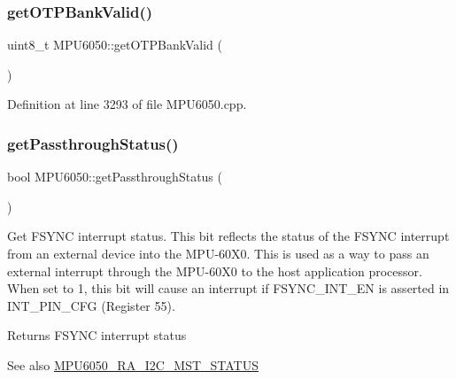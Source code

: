 \subsubsection{\texorpdfstring{getOTPBankValid()}{getOTPBankValid()}}
{\footnotesize\ttfamily uint8\+\_\+t M\+P\+U6050\+::get\+O\+T\+P\+Bank\+Valid (\begin{DoxyParamCaption}{ }\end{DoxyParamCaption})}



Definition at line 3293 of file M\+P\+U6050.\+cpp.


\begin{DoxyCode}{0}

\end{DoxyCode}
\mbox{\label{classMPU6050_af2820067b73f177d985ed81e894281b0}} 
\subsubsection{\texorpdfstring{getPassthroughStatus()}{getPassthroughStatus()}}
{\footnotesize\ttfamily bool M\+P\+U6050\+::get\+Passthrough\+Status (\begin{DoxyParamCaption}{ }\end{DoxyParamCaption})}

Get F\+S\+Y\+NC interrupt status. This bit reflects the status of the F\+S\+Y\+NC interrupt from an external device into the M\+P\+U-\/60\+X0. This is used as a way to pass an external interrupt through the M\+P\+U-\/60\+X0 to the host application processor. When set to 1, this bit will cause an interrupt if F\+S\+Y\+N\+C\+\_\+\+I\+N\+T\+\_\+\+EN is asserted in I\+N\+T\+\_\+\+P\+I\+N\+\_\+\+C\+FG (Register 55). \begin{DoxyReturn}{Returns}
F\+S\+Y\+NC interrupt status 
\end{DoxyReturn}
\begin{DoxySeeAlso}{See also}
\mbox{\hyperlink{MPU6050_8h_a5ef54580f436c198fb84d01288fbef49}{M\+P\+U6050\+\_\+\+R\+A\+\_\+\+I2\+C\+\_\+\+M\+S\+T\+\_\+\+S\+T\+A\+T\+US}} 
\end{DoxySeeAlso}



